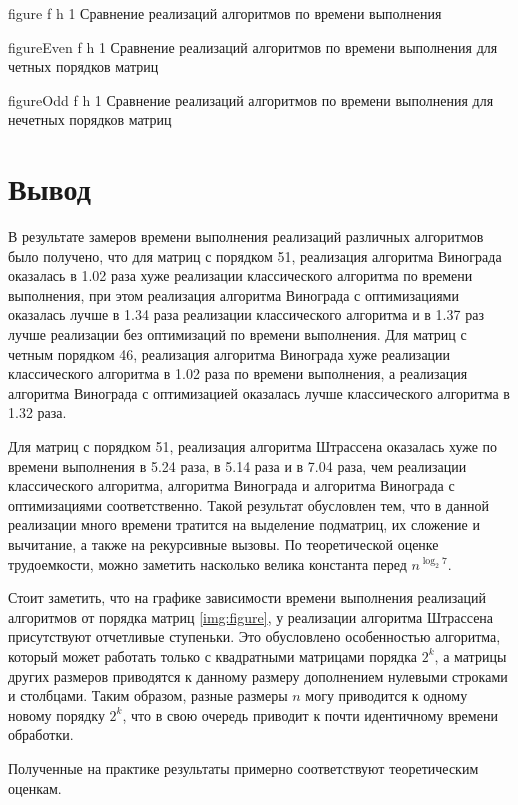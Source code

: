 {figure} %
{f} %
{h} %
{1\textwidth} %
{Сравнение реализаций алгоритмов по времени выполнения} %

{figureEven} %
{f} %
{h} %
{1\textwidth} %
{Сравнение реализаций алгоритмов по времени выполнения для четных порядков матриц} %

{figureOdd} %
{f} %
{h} %
{1\textwidth} %
{Сравнение реализаций алгоритмов по времени выполнения для нечетных порядков матриц} %


\clearpage

\section*{Вывод}

В результате замеров времени выполнения реализаций различных алгоритмов было получено, что для матриц с порядком 51, реализация алгоритма Винограда оказалась в 1.02 раза хуже реализации классического алгоритма по времени выполнения, при этом реализация алгоритма Винограда с оптимизациями оказалась лучше в 1.34 раза реализации классического алгоритма и в 1.37 раз лучше реализации без оптимизаций по времени выполнения. 
Для матриц с четным порядком 46, реализация алгоритма Винограда хуже реализации классического алгоритма в 1.02 раза по времени выполнения, а реализация алгоритма Винограда с оптимизацией оказалась лучше классического алгоритма в 1.32 раза. 

Для матриц с порядком 51, реализация алгоритма Штрассена оказалась хуже по времени выполнения в 5.24 раза, в 5.14 раза и в 7.04 раза, чем реализации классического алгоритма, алгоритма Винограда и алгоритма Винограда с оптимизациями соответственно. 
Такой результат обусловлен тем, что в данной реализации много времени тратится на выделение подматриц, их сложение и вычитание, а также на рекурсивные вызовы. По теоретической оценке трудоемкости, можно заметить насколько велика константа перед $n^{\log_{2}7}$.

Стоит заметить, что на графике зависимости времени выполнения реализаций алгоритмов от порядка матриц \ref{img:figure}, у реализации алгоритма Штрассена присутствуют отчетливые ступеньки.
Это обусловлено особенностью алгоритма, который может работать только с квадратными матрицами порядка $2^k$, а матрицы других размеров приводятся к данному размеру дополнением нулевыми строками и столбцами. 
Таким образом, разные размеры $n$ могу приводится к одному новому порядку $2^k$, что в свою очередь приводит к почти идентичному времени обработки.

Полученные на практике результаты примерно соответствуют теоретическим оценкам.